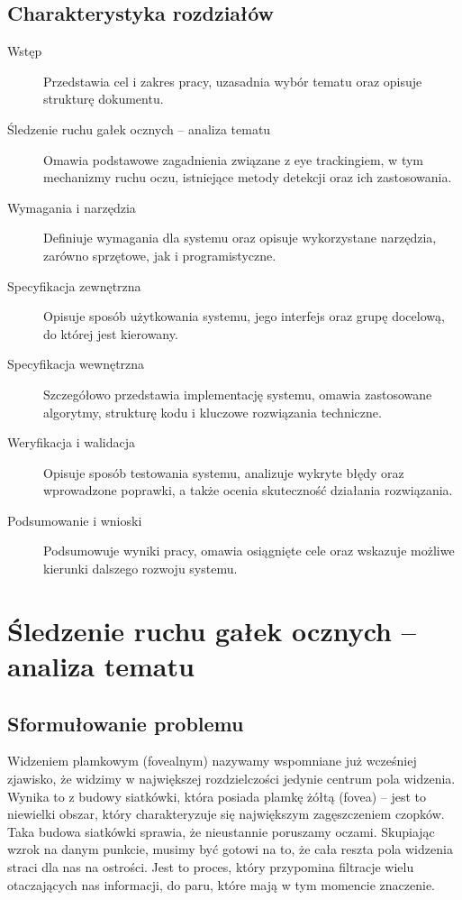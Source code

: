 \documentclass[a4paper,twoside,12pt]{book}
\begin{document}
\section{Charakterystyka rozdziałów}

\begin{description}
	\item[Wstęp] Przedstawia cel i zakres pracy, uzasadnia wybór tematu oraz opisuje strukturę dokumentu.
	\item[Śledzenie ruchu gałek ocznych -- analiza tematu] Omawia podstawowe zagadnienia związane z eye trackingiem, w tym mechanizmy ruchu oczu, istniejące metody detekcji oraz ich zastosowania.
	\item[Wymagania i narzędzia] Definiuje wymagania dla systemu oraz opisuje wykorzystane narzędzia, zarówno sprzętowe, jak i programistyczne.
	\item[Specyfikacja zewnętrzna] Opisuje sposób użytkowania systemu, jego interfejs oraz grupę docelową, do której jest kierowany.
	\item[Specyfikacja wewnętrzna] Szczegółowo przedstawia implementację systemu, omawia zastosowane algorytmy, strukturę kodu i kluczowe rozwiązania techniczne.
	\item[Weryfikacja i walidacja] Opisuje sposób testowania systemu, analizuje wykryte błędy oraz wprowadzone poprawki, a także ocenia skuteczność działania rozwiązania.
	\item[Podsumowanie i wnioski] Podsumowuje wyniki pracy, omawia osiągnięte cele oraz wskazuje możliwe kierunki dalszego rozwoju systemu.
\end{description}

%
%
%
\chapter{Śledzenie ruchu gałek ocznych -- analiza tematu}
\label{ch:analiza-tematu}

\section{Sformułowanie problemu}
\label{sec:sformulowanie-problemu}

Widzeniem plamkowym (fovealnym) nazywamy wspomniane już wcześniej zjawisko, że widzimy w największej rozdzielczości jedynie centrum pola widzenia. Wynika to z budowy siatkówki, która posiada plamkę żółtą (fovea) -- jest to niewielki obszar, który charakteryzuje się największym zagęszczeniem czopków. Taka budowa siatkówki sprawia, że nieustannie poruszamy oczami. Skupiając wzrok na danym punkcie, musimy być gotowi na to, że cała reszta pola widzenia straci dla nas na ostrości. Jest to proces, który przypomina filtracje wielu otaczających nas informacji, do paru, które mają w tym momencie znaczenie.
\end{document}

